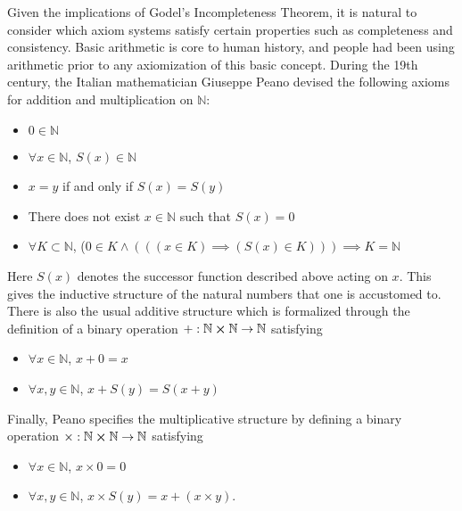 \documentclass[%
 reprint,
 amsmath,amssymb,
 aps,
]{revtex4-2}
\begin{document}
Given the implications of Godel's Incompleteness Theorem, it is natural to consider which axiom systems satisfy certain properties such as completeness and consistency.  Basic arithmetic is core to human history, and people had been using arithmetic prior to any axiomization of this basic concept.  During the 19th century, the Italian mathematician Giuseppe Peano devised the following axioms for addition and multiplication on $\mathbb{N}$:
\begin{itemize}
    \item $0 \in \mathbb{N}$
    \item $\forall x \in \mathbb{N}$, $S(x) \in \mathbb{N}$
    \item $x = y$ if and only if $S(x) = S(y)$
    \item There does not exist $x \in \mathbb{N}$ such that $S(x) = 0$
    \item $\forall K \subset \mathbb{N}$, ($0 \in K \land (((x \in K) \implies (S(x) \in K))) \implies K = \mathbb{N}$
\end{itemize}
    Here $S(x)$ denotes the successor function described above acting on $x$.  This gives the inductive structure of the natural numbers that one is accustomed to.  There is also the usual additive structure which is formalized through the definition of a binary operation $+ : \mathbb{N} \cross \mathbb{N} \rightarrow \mathbb{N}$ satisfying 
    \begin{itemize}
        \item $\forall x \in \mathbb{N}$,  $x + 0 = x$
        \item $\forall x,y \in \mathbb{N}$,  $x + S(y) = S(x+y)$
    \end{itemize}
    Finally, Peano specifies the multiplicative structure by defining a binary operation $\times : \mathbb{N} \cross \mathbb{N} \rightarrow \mathbb{N}$ satisfying 
    \begin{itemize}
        \item $\forall x \in \mathbb{N}$, $ x \times 0 = 0$
        \item $\forall x,y \in \mathbb{N}$,  $x \times S(y) = x + (x \times y)$.  
    \end{itemize}
    
\end{document}
